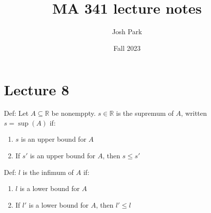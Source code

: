 \documentclass{report}
\title{MA 341 lecture notes}
\author{Josh Park}
\date{Fall 2023}
\newcommand{\R}{\mathbb{R}}  %
\theoremstyle{mystyle}
\theoremstyle{customtheorem}
\begin{document}
    \maketitle
    \setlength{\parindent}{0pt}
    \chapter*{Lecture 8}
    Def: Let $A \subseteq \R$ be nonemppty. $s \in \R$ is the supremum of $A$, written $s=\sup(A)$ if:
    \begin{enumerate}[label=(\roman*)] \vspace{-1em}
        \item $s$ is an upper bound for $A$
        \item If $s'$ is an upper bound for $A$, then $s \leq s'$
    \end{enumerate}

    Def: $l$ is the infimum of $A$ if: \vspace{-1em}
    \begin{enumerate}[label=(\roman*)]
        \item $l$ is a lower bound for $A$
        \item If $l'$ is a lower bound for $A$, then $l'\leq l$
    \end{enumerate}
\end{document}
